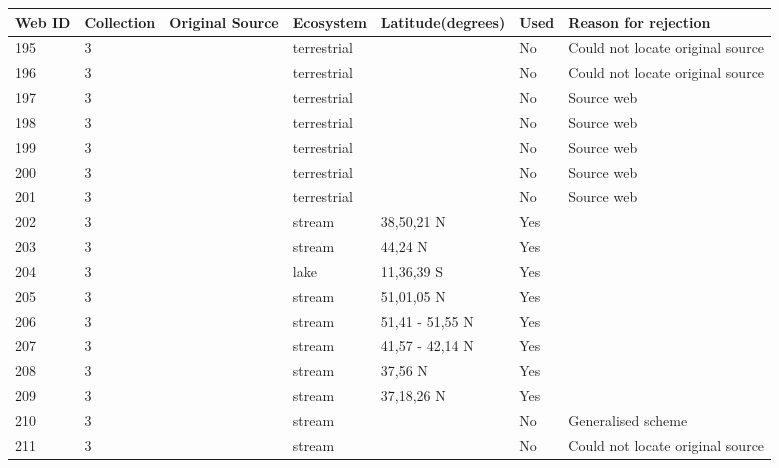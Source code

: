 \documentclass[12pt]{article}
\begin{document}
\begin{landscape}
        \newpage

    \begin{table}[h!]
    \centering
    {\footnotesize
      \begin{tabular}{p{2.8cm}p{1.3cm}p{3cm}p{2.2cm}p{2.5cm}lp{8.2cm}}
        \hline
        Web ID & Collection & Original Source & Ecosystem & Latitude(degrees) & Used  & Reason for rejection  \\
        \hline
        195   & 3 & \cite{Schoenly1983a}    & terrestrial &       & No    & Could not locate original source \\
        196   & 3 & \cite{Schoenly1983a}    & terrestrial &       & No    & Could not locate original source \\
        197   & 3 & \cite{Mohr1943}    & terrestrial &       & No    & Source web \\
        198   & 3 & \cite{Schoenly1983}  & terrestrial &       & No    & Source web \\
        199   & 3 & \cite{Valiela1969}    & terrestrial &       & No    & Source web \\
        200   & 3 & \cite{Valiela1974}    & terrestrial &       & No    & Source web \\
        201   & 3 & \cite{Valiela1974}    & terrestrial &       & No    & Source web \\
        202   & 3 & \cite{Allan1982}    & stream & 38,50,21 N & Yes   &       \\
        203   & 3 & \cite{Collins1976}    & stream & 44,24 N & Yes   &       \\
        204   & 3 & \cite{Fryer1959} & lake  & 11,36,39 S & Yes   &       \\
        205   & 3 & \cite{Hildrew1985}     & stream & 51,01,05 N & Yes   &       \\
        206   & 3 & \cite{Jones1949}     & stream & 51,41 - 51,55 N & Yes   &       \\
        207   & 3 & \cite{Koslucher1973}    & stream & 41,57 - 42,14 N & Yes   &       \\
        208   & 3 & \cite{Minckley1963}    & stream & 37,56 N & Yes   &       \\
        209   & 3 & \cite{Minshall1967}    & stream & 37,18,26 N & Yes   &       \\
        210   & 3 & \cite{Percival1929}     & stream &       & No    & Generalised scheme \\
        211   & 3 & \cite{Ricker1935}  & stream &       & No    & Could not locate original source \\

\end{tabular}}
\end{table}
\end{landscape}
\end{document}
